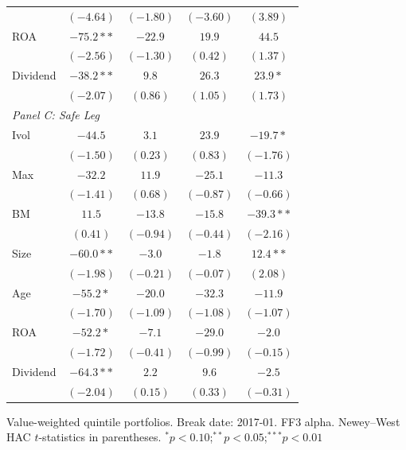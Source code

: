 \begin{table}[htbp]
\begin{tabular}{l c c c c}
 & $(-4.64)$ & $(-1.80)$ & $(-3.60)$ & $(3.89)$ \\
ROA & $-75.2**$ & $-22.9$ & $19.9$ & $44.5$ \\
 & $(-2.56)$ & $(-1.30)$ & $(0.42)$ & $(1.37)$ \\
Dividend & $-38.2**$ & $9.8$ & $26.3$ & $23.9*$ \\
 & $(-2.07)$ & $(0.86)$ & $(1.05)$ & $(1.73)$ \\
\midrule
\multicolumn{5}{l}{\textit{Panel C: Safe Leg}} \\
Ivol & $-44.5$ & $3.1$ & $23.9$ & $-19.7*$ \\
 & $(-1.50)$ & $(0.23)$ & $(0.83)$ & $(-1.76)$ \\
Max & $-32.2$ & $11.9$ & $-25.1$ & $-11.3$ \\
 & $(-1.41)$ & $(0.68)$ & $(-0.87)$ & $(-0.66)$ \\
BM & $11.5$ & $-13.8$ & $-15.8$ & $-39.3**$ \\
 & $(0.41)$ & $(-0.94)$ & $(-0.44)$ & $(-2.16)$ \\
Size & $-60.0**$ & $-3.0$ & $-1.8$ & $12.4**$ \\
 & $(-1.98)$ & $(-0.21)$ & $(-0.07)$ & $(2.08)$ \\
Age & $-55.2*$ & $-20.0$ & $-32.3$ & $-11.9$ \\
 & $(-1.70)$ & $(-1.09)$ & $(-1.08)$ & $(-1.07)$ \\
ROA & $-52.2*$ & $-7.1$ & $-29.0$ & $-2.0$ \\
 & $(-1.72)$ & $(-0.41)$ & $(-0.99)$ & $(-0.15)$ \\
Dividend & $-64.3**$ & $2.2$ & $9.6$ & $-2.5$ \\
 & $(-2.04)$ & $(0.15)$ & $(0.33)$ & $(-0.31)$ \\
\bottomrule
\end{tabular}
\vspace{4pt}
\begin{minipage}{0.9\textwidth}
\footnotesize
Value-weighted quintile portfolios. Break date: 2017-01. FF3 alpha.
Newey--West HAC $t$-statistics in parentheses.
$^{*}p<0.10$;\quad $^{**}p<0.05$;\quad $^{***}p<0.01$
\end{minipage}
\end{table}
